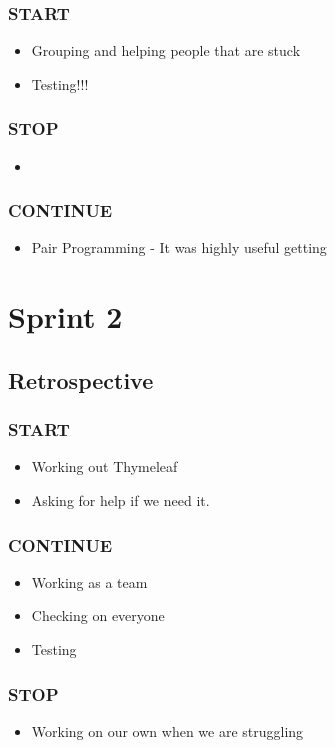 \documentclass[]{report}
\begin{document}
			\subsection*{START}
				\begin{itemize}
					\item Grouping and helping people that are stuck
					\item Testing!!!
				\end{itemize}
				\subsection*{STOP}
				\begin{itemize}
					\item 
				\end{itemize}
				\subsection*{CONTINUE}
				\begin{itemize}
					\item Pair Programming - It was highly useful getting 
				\end{itemize}
	\chapter*{Sprint 2}
		\section*{Retrospective}
			\subsection*{START}
				\begin{itemize}
					\item Working out Thymeleaf
					\item Asking for help if we need it.
				\end{itemize}
			\subsection*{CONTINUE}
				\begin{itemize}
					\item Working as a team
					\item Checking on everyone
					\item Testing
				\end{itemize}
			\subsection*{STOP}
				\begin{itemize}
					\item Working on our own when we are struggling
				\end{itemize}
\end{document}
